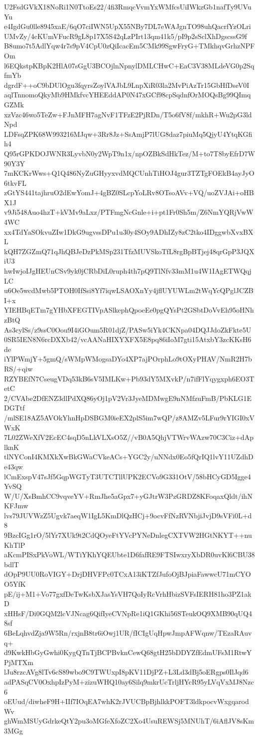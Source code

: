 U2FsdGVkX18NoRi1N0TtoEs22/4fi3RmqcVvmYxWMfcsUiIWkzGb1nafTy9UVuYu
e4IgdGu0lle8945xaE/6qO7ciIWN5UpX55NBy7DL7eWAJgnTO98uhQacrfYzOLri
UMvZy/4cKUmVFucR9gL8p17X5S42qLzPIrt13qm41k5/pI9p2sSclXhDgscssG9f
B8umo7t5AdlYqw4r7s9pV4CpU0zQiIcacEm5CMk99SgwFryG+TMkhqvGrhzNPFOm
l6EQkstpKBpK2HlA07sGgU3BCOjlnNpnylDMLCHwC+EaC3V38MLdeVG0p2SqfmYb
dgrdF++oC9bDUlOgu3fqyrsZoylVAJbL9LnpXiR03la2MvPiAzTr15GbHfDseV0I
aqlTnnomoQkyMb9HMkfvcYHEEddAP0N47xGCf98cpSqdnfOrMOQsBg99QImqGZMk
xzVzc46wo5TeZw+FJnMFH7agNvF1TFzE2PjRDn/T5o6fV8f/mkhR+Wu2pG3ldNpd
LDFsqZPK68W993216MJqw+3Rr8Jz+SsAmjP7lUG8daz7piuMq5QjyU4YtqKGfih4
Q95rGPKDOJWNR3LyvbN0y2WpT9n1x/npOZBkSdHkTez/M+to7T8byEfrD7W90Y3Y
7mKCKrWws+Q1Q486NyZuGHyyxvdMQCUnhTiHOJ4gur3TZTgFOEkB4ayJyO6tkvFL
zGtYS441tajhruO2dEwYomJ+4gBZ0SLcpYoLRv8OTsoAVv+VQ/uoZVJAi+oHBX1J
v9Ji548Auo4hzT+kVMv9aLxz/PTFmgNcGnle+i+pt1Fr0Sh5m/Z6NmYQRjVwW4WC
xx4TdYaSOkvuZIw1DkG9ugvssDPu1u30y4SOy9ADhIZy8zC2tko4IDggwbXvxBXL
kQH7ZGZmQ71qJhQBJeDzPkMSp231TfzMUVSkoTfL8rgBpBTjej48qrGpP3JQXiU3
hwIwjoIJgHEUnCSv9yk0jCRbDiL0ruph4th7pQ9TlNfv33mM1u4W1IAgETWQqjLC
u6Oe5wcdMwb5PTOH0IfSsi8Yf7iqwLSAOXnYy4jflUYUWLm2tWqYcQPglJCZBI+x
YIEHBqETm7gYHbXFEGTIVpASlkephQpoeEe0pgQYsPt2GSbtDoVvEh95oHNhzBtQ
As3cylSs/z9ssC0Oou9I4iGOum5R01djZ/PASw5iYk4CKNpa04DQJJdoZkFkte5U
0SR5IEN8N6rcDXXb42/vcAANaHIXYXFX5E8pq86iIoM7gti15AtxbY3zcKKsH6de
iYlPWmjY+5gmQ/sWMpWMogsaDYo4XP7ajPOrphLo9tOXyPHAV/NmR2H7bRS/+qiw
RZYBEfN7CseugVDq53kB6sV5IMLKw+Pb93dY5MXvkP/n7ifFlYqygxph6EO3TetC
2/CVAbe2DfENZ3dlPdXQ86yOj1pV2Vr3JyeMDMwgE9nNMfzuFmB/PbKLG1EDGTtf
/mlSE18AZ5AVOkYhnHpDSBGM0ieEX2plS5im7wQP/z8AMZv5LFur9rYIGI0xVWxK
7L02ZWeXfV2EcEC4sqD5nLkVLXsO5Z//vB0A5QhjVTWrvWAzw70C3Ciz+dAplknK
tlNYConI4KMXkXwBkGWaCVkeACs+YGC2y/uNNdx0Eo5fQrIQ1lvY11UZdhDe43qw
lCmExspV47sJf5GqpWGTyT3UTCTllUPK2ECVo9G331OtV/58bHCyGD5Igge4YvSQ
W/U/XsBmhCC9vqveYV+RmJhe5aGpx7+yGJtrW3PzGRDZ8KFoqaxQldt/ihNKFJmw
lvs79JUVWzZ5Ugvk7aeqW1IgL5KmDlQzHCj+9ocvFfNzRVNbjiJvjD9sVFi0L+d8
9BzcIGg1rO/5lYr7XUk9t2CdQOyeFtYVcPYNeDnlegCXTVW2HGtNKYT++nuKhTlP
aKcmPISxPkVoWL/WTiYKhYQEUbte1D6fafRE9FTSIwxryXbDR0uvKl6CBU38bdlT
dOpP9UU0RoVIGY+DrjDHVFPc0TCxA13iKTZfJufoOjBJpiaFawwcU71mCYOO5YfK
pE/ij+M1+Vo77gxfDeTwKsbXJasYsVH7QoIyRcVrhHbizSVFsIERH81ho3PZ1akD
xHHsF/Di0GQM2lcVJNcag6QifIyeCVNpRe1iQ1GKhi56STeukOQ9XMB90qUQ48sf
6BeLqhvdZja9W5Rn/rxjnB8tr6iOwj1UR/fICIgUqHpwJmpAFWqnw/TEzaRAuvq+
d9KwkHbGyGwhi0KygQTnTjBCPBvknCewQ68gtH25bDDYZfEdmUFsM1RtwYPjMTXm
lJu8rzcAVg8lTv6cS89wbo9C9TWUxpI8pKV11DjPZ+L3Ld3dBj5oERgps0IlJqd6
adPASqCV0OxhpIzPyM+zizuWHQ10ay6Silq9mkrUcTrljHYcR95yLVqVxMJ8Nzc6
oEUud/diwheF9H+IIf7IOqEA7whK2rJVUCBpBjhlkkPOFT3ldkpocvWxgqarodWv
ghWmMSUyGdrkeQtY2pu3oMGfeXfoZC2Xo4UsuREWSj5MNUhT/6iAflJV8sKm3MGg
